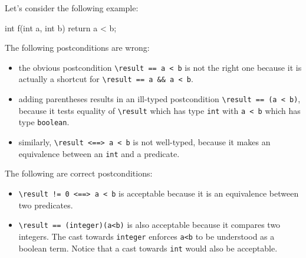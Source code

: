 

Let's consider the following example:
\begin{c}
  int f(int a, int b) { return a < b; }
\end{c}
The following postconditions are wrong:
\begin{itemize}
\item the obvious postcondition \verb|\result == a < b| is not the
  right one because it is 
  actually a shortcut for \verb|\result == a && a < b|.
\item adding parentheses results in an ill-typed postcondition
  \verb|\result == (a < b)|, 
  because it tests equality of \verb|\result| which has
  type \verb|int| with \verb|a < b| which has type \verb|boolean|.
\item similarly, \verb|\result <==> a < b| is not well-typed, because
  it makes an equivalence between an \verb|int| and a predicate.  
\end{itemize}
The following are correct postconditions:
\begin{itemize}
\item \verb|\result != 0 <==> a < b| is acceptable because it is an
  equivalence between two predicates.
\item \verb|\result == (integer)(a<b)| is also acceptable because it compares
  two integers. The cast towards \verb|integer| enforces
  \verb|a<b| to be understood as a boolean term. Notice that a cast
  towards \verb|int| would also be acceptable. 
\end{itemize}


